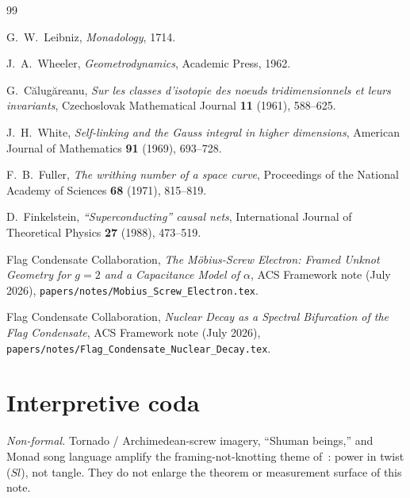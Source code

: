 \documentclass[11pt,a4paper]{article}
\theoremstyle{definition}
\theoremstyle{remark}
\begin{document}
\begin{thebibliography}{99}

G.~W.~Leibniz,
\textit{Monadology},
1714.

J.~A.~Wheeler,
\textit{Geometrodynamics},
Academic Press, 1962.

G.~C\u{a}lug\u{a}reanu,
\textit{Sur les classes d'isotopie des noeuds tridimensionnels et leurs invariants},
Czechoslovak Mathematical Journal \textbf{11} (1961), 588--625.

J.~H.~White,
\textit{Self-linking and the Gauss integral in higher dimensions},
American Journal of Mathematics \textbf{91} (1969), 693--728.

F.~B.~Fuller,
\textit{The writhing number of a space curve},
Proceedings of the National Academy of Sciences \textbf{68} (1971), 815--819.

D.~Finkelstein,
\textit{``Superconducting'' causal nets},
International Journal of Theoretical Physics \textbf{27} (1988), 473--519.

Flag Condensate Collaboration,
\textit{The M\"obius-Screw Electron: Framed Unknot Geometry for $g=2$ and a Capacitance Model of $\alpha$},
ACS Framework note (July 2026),
\texttt{papers/notes/Mobius\_Screw\_Electron.tex}.

Flag Condensate Collaboration,
\textit{Nuclear Decay as a Spectral Bifurcation of the Flag Condensate},
ACS Framework note (July 2026),
\texttt{papers/notes/Flag\_Condensate\_Nuclear\_Decay.tex}.

\end{thebibliography}

\appendix
\section{Interpretive coda}
\label{app:coda}

\noindent\textit{Non-formal.}  Tornado / Archimedean-screw imagery,
``Shuman beings,'' and Monad song language amplify the framing-not-knotting
theme of~\cite{Mobius2026}: power in twist ($Sl$), not tangle.  They do
not enlarge the theorem or measurement surface of this note.
\end{document}
